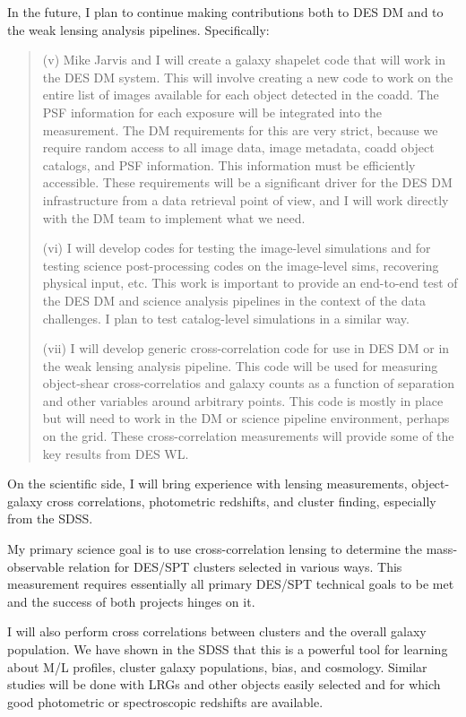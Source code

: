 \documentclass[12pt]{letter}
\begin{document}
In the future, I plan to continue making contributions both to DES DM and to
the weak lensing analysis pipelines. Specifically:

\begin{quotation}
(v) Mike Jarvis and I will create a galaxy shapelet code that will work in the
DES DM system.  This will involve creating a new code to work on the entire
list of images available for each object detected in the coadd.  The PSF
information for each exposure will be integrated into the measurement.  The DM
requirements for this are very strict, because we require random access to all
image data, image metadata, coadd object catalogs, and PSF information.  This
information must be efficiently accessible.  These requirements will be a
significant driver for the DES DM infrastructure from a data retrieval point of
view, and I will work directly with the DM team to implement what we need.
\newline

(vi) I will develop codes for testing the image-level simulations and for
testing science post-processing codes on the image-level sims, recovering
physical input, etc.  This work is important to provide an end-to-end test of
the DES DM and science analysis pipelines in the context of the data
challenges.  I plan to test catalog-level simulations in a similar way.
\newline

(vii) I will develop generic cross-correlation code for use in DES DM or in the
weak lensing analysis pipeline. This code will be used for measuring
object-shear cross-correlatios and galaxy counts as a function of separation
and other variables around arbitrary points.  This code is mostly in place but
will need to work in the DM or science pipeline environment, perhaps on the
grid. These cross-correlation measurements will provide some of the key results
from DES WL.
\end{quotation}

On the scientific side, I will bring experience with lensing measurements,
object-galaxy cross correlations, photometric redshifts, and cluster finding,
especially from the SDSS. 

My primary science goal is to use cross-correlation lensing to determine the
mass-observable relation for DES/SPT clusters selected in various ways.  This
measurement requires essentially all primary DES/SPT technical goals to be met
and the success of both projects hinges on it.

I will also perform cross correlations between clusters and the overall galaxy
population. We have shown in the SDSS that this is a powerful tool for learning
about M/L profiles, cluster galaxy populations, bias, and cosmology.  Similar
studies will be done with LRGs and other objects easily selected and for which
good photometric or spectroscopic redshifts are available.  
\end{document}
